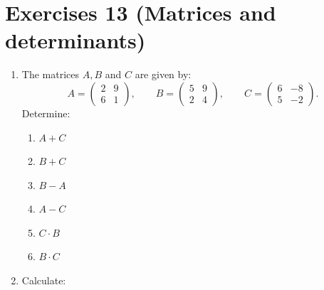 \documentclass[
  12pt,
  oneside]{book}
\providecommand{\tightlist}{%
  \setlength{\itemsep}{0pt}\setlength{\parskip}{0pt}}
\theoremstyle{definition}
\theoremstyle{definition}
\theoremstyle{definition}
\theoremstyle{definition}
\theoremstyle{remark}
\begin{document}
\chapter*{Exercises 13 (Matrices and determinants)}\label{exercises-13-matrices-and-determinants}

\begin{enumerate}
\def\labelenumi{\arabic{enumi}.}
\item
  The matrices \(A,B\) and \(C\) are given by:
  \[A=\begin{pmatrix}2&9\\6&1\end{pmatrix},\qquad B=\begin{pmatrix}5&9\\2&4\end{pmatrix},\qquad C=\begin{pmatrix}6&-8\\5&-2\end{pmatrix}.\]
  Determine:

  \begin{enumerate}
  \def\labelenumii{\roman{enumii})}
  \tightlist
  \item
    \(A+C\)
  \item
    \(B+C\)
  \item
    \(B-A\)
  \item
    \(A-C\)
  \item
    \(C\cdot B\)
  \item
    \(B\cdot C\)
  \end{enumerate}
\item
  Calculate:


\end{enumerate}
\end{document}
